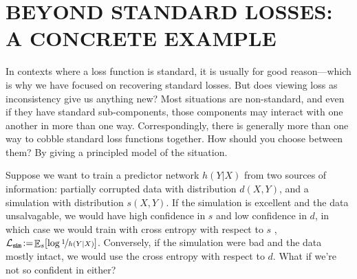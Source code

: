 \documentclass[twoside]{article}
\theoremstyle{plain}
\theoremstyle{definition}
\DeclareMathOperator*{\Ex}{\mathbb{E}} %
\begin{document}
\section{BEYOND STANDARD LOSSES: A CONCRETE EXAMPLE}
%
In contexts where a loss function is standard, it is usually for good reason---which is why we have focused on recovering standard losses.
But does viewing loss as inconsistency give us anything new?
Most situations are non-standard, and even if they have standard sub-components, those components may interact with one another in more than one way. 
Correspondingly, there is generally more than one way to cobble standard loss functions together. 
How should you choose between them? 
By giving a principled model of the situation. 

\def\simsymb{\texttt{s\kern-1.1pti\kern-0.8ptm}}
\def\datsymb{\texttt{d\kern-0.75pta\kern-1ptt}}
\def\ssymb{\texttt{s}}
\def\dsymb{\texttt{d}}
Suppose we want to train a predictor network $h(Y|X)$ from two sources of information:
partially corrupted data with distribution $d(X,Y)$,
and a simulation with distribution $s(X,Y)$.
If the simulation is excellent and the data unsalvagable, we would have high confidence in $s$ and low confidence in $d$, 
in which case we would train with cross entropy with respect to $s$%
, $\mathcal L_{\simsymb}\!:=\!\Ex_s [\log \nf1{h(Y|X)}]$.
Conversely, if the simulation were bad and the data mostly intact, we would use
the cross entropy with respect to $d$.
What if we're not so confident in either?
\end{document}
